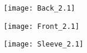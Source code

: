\documentclass[12pt,landscape]{article}
\begin{document}
\begin{figure}[!ht]

\texttt{[image: Back\_2.1]}

\end{figure}

\clearpage
\begin{figure}[!ht]

\texttt{[image: Front\_2.1]}

\end{figure}

\clearpage
\begin{figure}[!ht]

\texttt{[image: Sleeve\_2.1]}

\end{figure}
\end{document}
